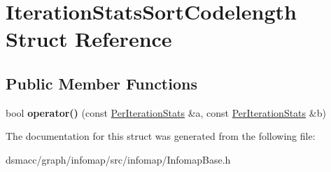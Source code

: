 \hypertarget{structIterationStatsSortCodelength}{}\section{Iteration\+Stats\+Sort\+Codelength Struct Reference}
\label{structIterationStatsSortCodelength}
\subsection*{Public Member Functions}
\begin{DoxyCompactItemize}
\item 
\mbox{\label{structIterationStatsSortCodelength_a2d8004ab6c2cd6521feab09a695f6d5e}} 
bool {\bfseries operator()} (const \mbox{\hyperlink{structPerIterationStats}{Per\+Iteration\+Stats}} \&a, const \mbox{\hyperlink{structPerIterationStats}{Per\+Iteration\+Stats}} \&b)
\end{DoxyCompactItemize}


The documentation for this struct was generated from the following file\+:\begin{DoxyCompactItemize}
\item 
dsmacc/graph/infomap/src/infomap/Infomap\+Base.\+h\end{DoxyCompactItemize}
